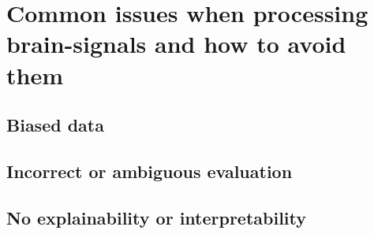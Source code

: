 


\lipsum[1-7]



\section{Common issues when processing brain-signals and how to avoid them}
\label{sec:processing_signals_common_issues}

\lipsum[1-2]


\subsection{Biased data}
\label{subsec:processing_signals_common_issues_bias}

\lipsum[1-3]


\subsection{Incorrect or ambiguous evaluation}
\label{subsec:processing_signals_common_issues_generalisation}

\lipsum[1-3]


\subsection{No explainability or interpretability}
\label{subsec:processing_signals_common_issues_exaplainable}

